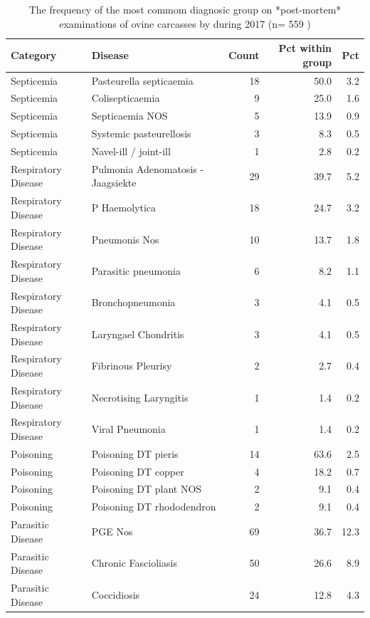 \documentclass[]{book}
\begin{document}
\begin{table}

\caption{\label{tab:unnamed-chunk-24}The frequency of the most commom diagnosic group on *post-mortem* examinations of ovine carcasses by during 2017 (n= 559 )}
\centering
\begin{tabular}[t]{l|l|r|r|r}
\hline
Category & Disease & Count & Pct within group & Pct\\
\hline
Septicemia & Pasteurella septicaemia & 18 & 50.0 & 3.2\\
\hline
Septicemia & Colisepticaemia & 9 & 25.0 & 1.6\\
\hline
Septicemia & Septicaemia NOS & 5 & 13.9 & 0.9\\
\hline
Septicemia & Systemic pasteurellosis & 3 & 8.3 & 0.5\\
\hline
Septicemia & Navel-ill / joint-ill & 1 & 2.8 & 0.2\\
\hline
Respiratory Disease & Pulmonia Adenomatosis - Jaagsiekte & 29 & 39.7 & 5.2\\
\hline
Respiratory Disease & P Haemolytica & 18 & 24.7 & 3.2\\
\hline
Respiratory Disease & Pneumonis Nos & 10 & 13.7 & 1.8\\
\hline
Respiratory Disease & Parasitic pneumonia & 6 & 8.2 & 1.1\\
\hline
Respiratory Disease & Bronchopneumonia & 3 & 4.1 & 0.5\\
\hline
Respiratory Disease & Laryngael Chondritis & 3 & 4.1 & 0.5\\
\hline
Respiratory Disease & Fibrinous Pleurisy & 2 & 2.7 & 0.4\\
\hline
Respiratory Disease & Necrotising Laryngitis & 1 & 1.4 & 0.2\\
\hline
Respiratory Disease & Viral Pneumonia & 1 & 1.4 & 0.2\\
\hline
Poisoning & Poisoning DT pieris & 14 & 63.6 & 2.5\\
\hline
Poisoning & Poisoning DT copper & 4 & 18.2 & 0.7\\
\hline
Poisoning & Poisoning DT plant NOS & 2 & 9.1 & 0.4\\
\hline
Poisoning & Poisoning DT rhododendron & 2 & 9.1 & 0.4\\
\hline
Parasitic Disease & PGE Nos & 69 & 36.7 & 12.3\\
\hline
Parasitic Disease & Chronic Fascioliasis & 50 & 26.6 & 8.9\\
\hline
Parasitic Disease & Coccidiosis & 24 & 12.8 & 4.3\\

\end{tabular}
\end{table}
\end{document}
